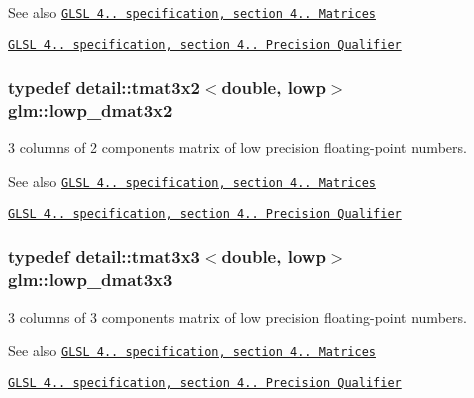 \begin{DoxySeeAlso}{See also}
\href{http://www.opengl.org/registry/doc/GLSLangSpec.4.20.8.pdf}{\tt G\+L\+SL 4.. specification, section 4.. Matrices} 

\href{http://www.opengl.org/registry/doc/GLSLangSpec.4.20.8.pdf}{\tt G\+L\+SL 4.. specification, section 4.. Precision Qualifier} 
\end{DoxySeeAlso}
\subsubsection[{\texorpdfstring{lowp\+\_\+dmat3x2}{lowp_dmat3x2}}]{\setlength{\rightskip}{0pt plus 5cm}typedef detail\+::tmat3x2$<$double, lowp$>$ {\bf glm\+::lowp\+\_\+dmat3x2}}\hypertarget{group__core__precision_ga678c21e4fadeda255cfb146d40844bdd}{}\label{group__core__precision_ga678c21e4fadeda255cfb146d40844bdd}
3 columns of 2 components matrix of low precision floating-\/point numbers.

\begin{DoxySeeAlso}{See also}
\href{http://www.opengl.org/registry/doc/GLSLangSpec.4.20.8.pdf}{\tt G\+L\+SL 4.. specification, section 4.. Matrices} 

\href{http://www.opengl.org/registry/doc/GLSLangSpec.4.20.8.pdf}{\tt G\+L\+SL 4.. specification, section 4.. Precision Qualifier} 
\end{DoxySeeAlso}
\subsubsection[{\texorpdfstring{lowp\+\_\+dmat3x3}{lowp_dmat3x3}}]{\setlength{\rightskip}{0pt plus 5cm}typedef detail\+::tmat3x3$<$double, lowp$>$ {\bf glm\+::lowp\+\_\+dmat3x3}}\hypertarget{group__core__precision_gaea1bc4ede38e1b904f01ff5ce59210ea}{}\label{group__core__precision_gaea1bc4ede38e1b904f01ff5ce59210ea}
3 columns of 3 components matrix of low precision floating-\/point numbers.

\begin{DoxySeeAlso}{See also}
\href{http://www.opengl.org/registry/doc/GLSLangSpec.4.20.8.pdf}{\tt G\+L\+SL 4.. specification, section 4.. Matrices} 

\href{http://www.opengl.org/registry/doc/GLSLangSpec.4.20.8.pdf}{\tt G\+L\+SL 4.. specification, section 4.. Precision Qualifier} 
\end{DoxySeeAlso}
